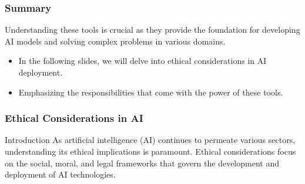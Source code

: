 \documentclass[aspectratio=169]{beamer}
\begin{document}
\begin{frame}
    \frametitle{Summary}
    Understanding these tools is crucial as they provide the foundation for developing AI models and solving complex problems in various domains. 
    \begin{itemize}
        \item In the following slides, we will delve into ethical considerations in AI deployment.
        \item Emphasizing the responsibilities that come with the power of these tools.
    \end{itemize}
\end{frame}

\begin{frame}[fragile]
    \frametitle{Ethical Considerations in AI}
    \begin{block}{Introduction}
        As artificial intelligence (AI) continues to permeate various sectors, understanding its ethical implications is paramount. Ethical considerations focus on the social, moral, and legal frameworks that govern the development and deployment of AI technologies. 
    \end{block}
\end{frame}
\end{document}
